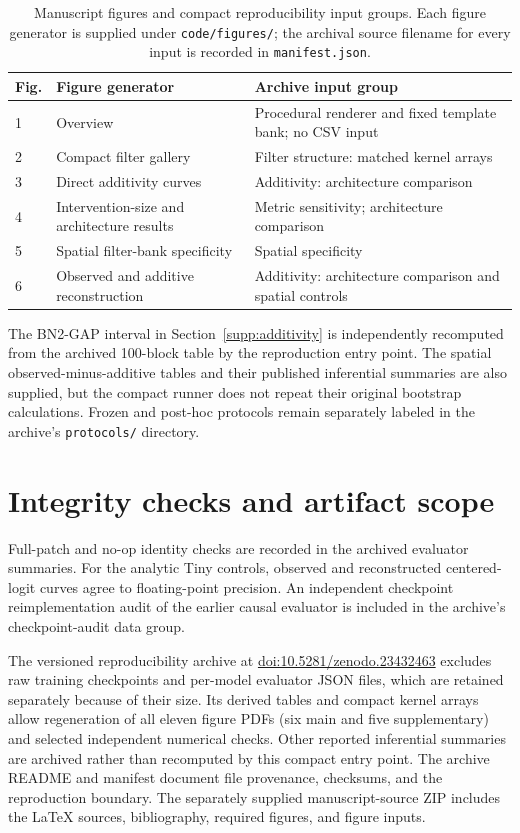 \documentclass[pdflatex,sn-basic]{sn-jnl}
\begin{document}
\begin{table}[h]
\caption{Manuscript figures and compact reproducibility input groups. Each figure
generator is supplied under \texttt{code/figures/}; the archival source filename
for every input is recorded in \texttt{manifest.json}.}
\label{tab:supp-repro-map}
\centering
\small
\setlength{\tabcolsep}{4pt}
\begin{tabular}{p{}p{}p{}}
\toprule
Fig. & Figure generator & Archive input group \\
\midrule
1 & Overview & Procedural renderer and fixed template bank; no CSV input \\
2 & Compact filter gallery & Filter structure: matched kernel arrays \\
3 & Direct additivity curves & Additivity: architecture comparison \\
4 & Intervention-size and architecture results & Metric sensitivity; architecture comparison \\
5 & Spatial filter-bank specificity & Spatial specificity \\
6 & Observed and additive reconstruction & Additivity: architecture comparison and spatial controls \\
\bottomrule
\end{tabular}
\end{table}

The BN2-GAP interval in Section~\ref{supp:additivity} is independently recomputed from the archived 100-block table by the reproduction entry point. The spatial observed-minus-additive tables and their published inferential summaries are also supplied, but the compact runner does not repeat their original bootstrap calculations. Frozen and post-hoc protocols remain separately labeled in the archive's \texttt{protocols/} directory.

\section{Integrity checks and artifact scope}\label{supp:integrity}

Full-patch and no-op identity checks are recorded in the archived evaluator summaries. For the analytic Tiny controls, observed and reconstructed centered-logit curves agree to floating-point precision. An independent checkpoint reimplementation audit of the earlier causal evaluator is included in the archive's checkpoint-audit data group.

The versioned reproducibility archive at \href{https://doi.org/10.5281/zenodo.23432463}{doi:10.5281/zenodo.23432463} excludes raw training checkpoints and per-model evaluator JSON files, which are retained separately because of their size. Its derived tables and compact kernel arrays allow regeneration of all eleven figure PDFs (six main and five supplementary) and selected independent numerical checks. Other reported inferential summaries are archived rather than recomputed by this compact entry point. The archive README and manifest document file provenance, checksums, and the reproduction boundary.
The separately supplied manuscript-source ZIP includes the LaTeX sources, bibliography, required figures, and figure inputs.
\end{document}
